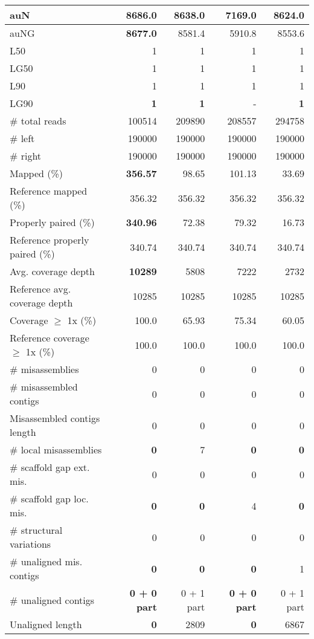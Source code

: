 \documentclass[12pt,a4paper]{article}
\begin{document}
\begin{table}[ht]
\begin{center}
\begin{tabular}{|l*{4}{|r}|}
auN & {\bf 8686.0} & 8638.0 & 7169.0 & 8624.0 \\ \hline
auNG & {\bf 8677.0} & 8581.4 & 5910.8 & 8553.6 \\ \hline
L50 & 1 & 1 & 1 & 1 \\ \hline
LG50 & 1 & 1 & 1 & 1 \\ \hline
L90 & 1 & 1 & 1 & 1 \\ \hline
LG90 & {\bf 1} & {\bf 1} & - & {\bf 1} \\ \hline
\# total reads & 100514 & 209890 & 208557 & 294758 \\ \hline
\# left & 190000 & 190000 & 190000 & 190000 \\ \hline
\# right & 190000 & 190000 & 190000 & 190000 \\ \hline
Mapped (\%) & {\bf 356.57} & 98.65 & 101.13 & 33.69 \\ \hline
Reference mapped (\%) & 356.32 & 356.32 & 356.32 & 356.32 \\ \hline
Properly paired (\%) & {\bf 340.96} & 72.38 & 79.32 & 16.73 \\ \hline
Reference properly paired (\%) & 340.74 & 340.74 & 340.74 & 340.74 \\ \hline
Avg. coverage depth & {\bf 10289} & 5808 & 7222 & 2732 \\ \hline
Reference avg. coverage depth & 10285 & 10285 & 10285 & 10285 \\ \hline
Coverage $\geq$ 1x (\%) & 100.0 & 65.93 & 75.34 & 60.05 \\ \hline
Reference coverage $\geq$ 1x (\%) & 100.0 & 100.0 & 100.0 & 100.0 \\ \hline
\# misassemblies & 0 & 0 & 0 & 0 \\ \hline
\# misassembled contigs & 0 & 0 & 0 & 0 \\ \hline
Misassembled contigs length & 0 & 0 & 0 & 0 \\ \hline
\# local misassemblies & {\bf 0} & 7 & {\bf 0} & {\bf 0} \\ \hline
\# scaffold gap ext. mis. & 0 & 0 & 0 & 0 \\ \hline
\# scaffold gap loc. mis. & {\bf 0} & {\bf 0} & 4 & {\bf 0} \\ \hline
\# structural variations & 0 & 0 & 0 & 0 \\ \hline
\# unaligned mis. contigs & {\bf 0} & {\bf 0} & {\bf 0} & 1 \\ \hline
\# unaligned contigs & {\bf 0 + 0 part} & 0 + 1 part & {\bf 0 + 0 part} & 0 + 1 part \\ \hline
Unaligned length & {\bf 0} & 2809 & {\bf 0} & 6867 \\ \hline

\end{tabular}
\end{center}
\end{table}
\end{document}
